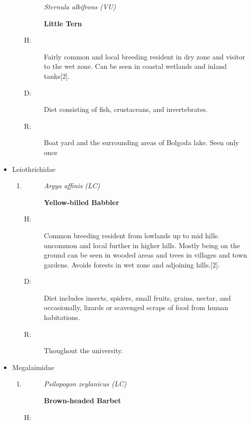 \begin{itemize}
\begin{enumerate}
\begin{description}%
\item[]%
\textit{Sternula albifrons (VU)}%
\item[]%
\textbf{Little Tern}%
\end{description}%
\begin{description}%
\item[H: ]%
Fairly common and local breeding resident in dry zone and visitor to the wet zone. Can be seen in coastal wetlands and inland tanks{[}2{]}.%
\item[D: ]%
Diet consisting of fish, crustaceans, and invertebrates.%
\item[R: ]%
Boat yard and the surrounding areas of Bolgoda lake. Seen only once%
\end{description}%
\end{enumerate}%
\item%
Leiothrichidae%
\begin{enumerate}%
\item%
\begin{description}%
\item[]%
\textit{Argya affinis (LC)}%
\item[]%
\textbf{Yellow{-}billed Babbler}%
\end{description}%
\begin{description}%
\item[H: ]%
Common breeding resident from lowlands up to mid hills. uncommon and local further in higher hills. Mostly being on the ground can be seen in wooded areas and trees in villages and town gardens. Avoids forests in wet zone and adjoining hills.{[}2{]}.%
\item[D: ]%
Diet includes insects, spiders, small fruits, grains, nectar, and occasionally, lizards or scavenged scraps of food from human habitations.%
\item[R: ]%
Thoughout the university.%
\end{description}%
\end{enumerate}%
\item%
Megalaimidae%
\begin{enumerate}%
\item%
\begin{description}%
\item[]%
\textit{Psilopogon zeylanicus (LC)}%
\item[]%
\textbf{Brown{-}headed Barbet}%
\end{description}%
\begin{description}%
\item[H: ]%

\end{description}
\end{enumerate}
\end{itemize}
